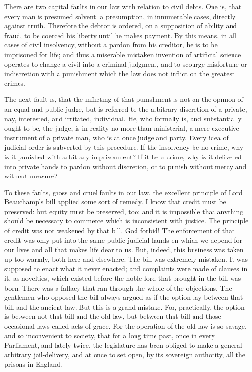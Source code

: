 There are two capital faults in our law with relation to civil debts. One is, that every man is presumed solvent: a presumption, in innumerable cases, directly against truth. Therefore the debtor is ordered, on a supposition of ability and fraud, to be coerced his liberty until he makes payment. By this means, in all cases of civil insolvency, without a pardon from his creditor, he is to be imprisoned for life; and thus a miserable mistaken invention of artificial science operates to change a civil into a criminal judgment, and to scourge misfortune or indiscretion with a punishment which the law does not inflict on the greatest crimes.

The next fault is, that the inflicting of that punishment is not on the opinion of an equal and public judge, but is referred to the arbitrary discretion of a private, nay, interested, and irritated, individual. He, who formally is, and substantially ought to be, the judge, is in reality no more than ministerial, a mere executive instrument of a private man, who is at once judge and party. Every idea of judicial order is subverted by this procedure. If the insolvency be no crime, why is it punished with arbitrary imprisonment? If it be a crime, why is it delivered into private hands to pardon without discretion, or to punish without mercy and without measure?

To these faults, gross and cruel faults in our law, the excellent principle of Lord Beauchamp's bill applied some sort of remedy. I know that credit must be preserved: but equity must be preserved, too; and it is impossible that anything should be necessary to commerce which is inconsistent with justice. The principle of credit was not weakened by that bill. God forbid! The enforcement of that credit was only put into the same public judicial hands on which we depend for our lives and all that makes life dear to us. But, indeed, this business was taken up too warmly, both here and elsewhere. The bill was extremely mistaken. It was supposed to enact what it never enacted; and complaints were made of clauses in it, as novelties, which existed before the noble lord that brought in the bill was born. There was a fallacy that ran through the whole of the objections. The gentlemen who opposed the bill always argued as if the option lay between that bill and the ancient law. But this is a grand mistake. For, practically, the option is between not that bill and the old law, but between that bill and those occasional laws called acts of grace. For the operation of the old law is so savage, and so inconvenient to society, that for a long time past, once in every Parliament, and lately twice, the legislature has been obliged to make a general arbitrary jail-delivery, and at once to set open, by its sovereign authority, all the prisons in England.

